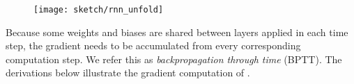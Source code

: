 \begin{figure}
\centering
\texttt{[image: sketch/rnn\_unfold]}
\label{fig:rnn_unfold} 
\end{figure}

Because some weights and biases are shared between layers applied in each time step, the gradient needs to be accumulated from every corresponding computation step. We refer this as \textit{backpropagation through time} (BPTT). The derivations below illustrate the gradient computation of \addfigure{\ref{fig:rnn_unfold}}.

%
%


